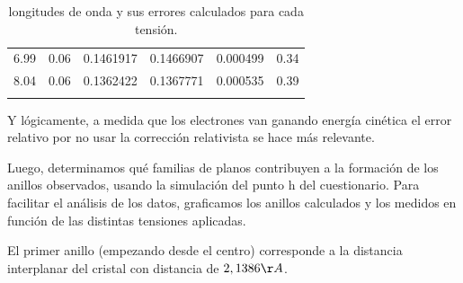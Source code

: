 \documentclass[]{article}
\begin{document}
\begin{longtable}[]{@{}llllll@{}}
\begin{minipage}[t]{0.12\columnwidth}
6.99\strut
\end{minipage} & \begin{minipage}[t]{0.16\columnwidth}\raggedright
0.06\strut
\end{minipage} & \begin{minipage}[t]{0.21\columnwidth}\raggedright
0.1461917\strut
\end{minipage} & \begin{minipage}[t]{0.14\columnwidth}\raggedright
0.1466907\strut
\end{minipage} & \begin{minipage}[t]{0.13\columnwidth}\raggedright
0.000499\strut
\end{minipage} & \begin{minipage}[t]{0.08\columnwidth}\raggedright
0.34\strut
\end{minipage}\tabularnewline
\begin{minipage}[t]{0.12\columnwidth}\raggedright
8.04\strut
\end{minipage} & \begin{minipage}[t]{0.16\columnwidth}\raggedright
0.06\strut
\end{minipage} & \begin{minipage}[t]{0.21\columnwidth}\raggedright
0.1362422\strut
\end{minipage} & \begin{minipage}[t]{0.14\columnwidth}\raggedright
0.1367771\strut
\end{minipage} & \begin{minipage}[t]{0.13\columnwidth}\raggedright
0.000535\strut
\end{minipage} & \begin{minipage}[t]{0.08\columnwidth}\raggedright
0.39\strut
\end{minipage}\tabularnewline
\bottomrule
\caption{longitudes de onda y sus errores calculados para cada
tensión.}\tabularnewline
\end{longtable}

Y lógicamente, a medida que los electrones van ganando energía cinética
el error relativo por no usar la corrección relativista se hace más
relevante.

Luego, determinamos qué familias de planos contribuyen a la formación de
los anillos observados, usando la simulación del punto h del
cuestionario. Para facilitar el análisis de los datos, graficamos los
anillos calculados y los medidos en función de las distintas tensiones
aplicadas.

El primer anillo (empezando desde el centro) corresponde a la distancia
interplanar del cristal con distancia de \(2,1386 \AA\).
\end{document}
